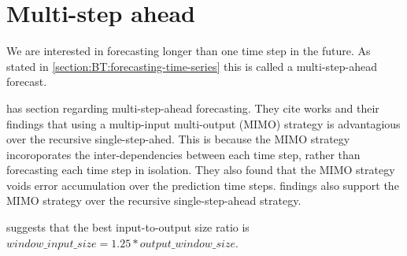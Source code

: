 \section{Multi-step ahead}
\label{section:RelatedWork:multi-step-ahead}
We are interested in forecasting longer than one time step in the future.
As stated in \autoref{section:BT:forecasting-time-series} this is called a multi-step-ahead forecast.

\cite{Hewamalage2021} has section regarding multi-step-ahead forecasting.
They cite \cite{BenTaieb2011} works and their findings that
using a multip-input multi-output (MIMO) strategy is
advantagious over the recursive single-step-ahed. This is because the MIMO strategy
incoroporates the inter-dependencies between each time step, rather than forecasting
each time step in isolation. They also found that the MIMO strategy voids error
accumulation over the prediction time steps.
\cite{Ramos2015} findings also support the MIMO strategy over the recursive
single-step-ahead strategy.

\cite{Hewamalage2021} suggests that the best input-to-output size ratio
is $window\_input\_size = 1.25 * output\_window\_size$.